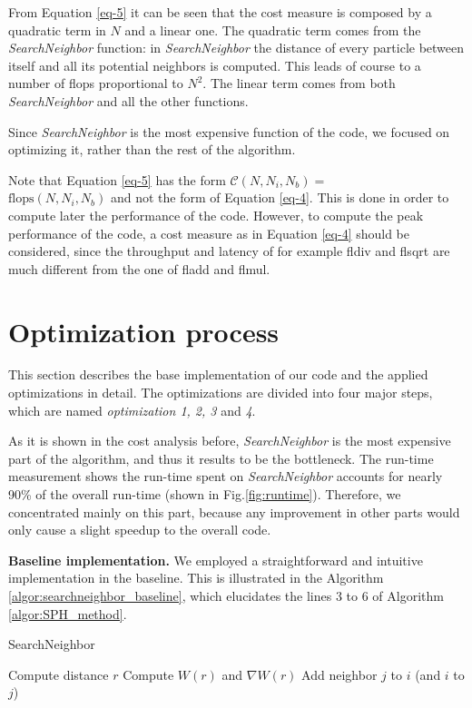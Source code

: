 \documentclass[letterpaper]{article}
\newcommand{\mypar}[1]{{\bf #1.}}
\begin{document}
From Equation \ref{eq-5} it can be seen that the cost measure is composed by a quadratic term in $N$ and a linear one. The quadratic term comes from the \emph{SearchNeighbor} function: in \emph{SearchNeighbor} the distance of every particle between itself and all its potential neighbors is computed. This leads of course to a number of flops proportional to $N^2$. The linear term comes from both \emph{SearchNeighbor} and all the other functions.

Since \emph{SearchNeighbor} is the most expensive function of the code, we focused on optimizing it, rather than the rest of the algorithm.

Note that Equation \ref{eq-5} has the form $\mathcal{C}(N, N_i, N_b)=$\\ $\text{flops}(N, N_i, N_b)$ and not the form of Equation \ref{eq-4}. This is done in order to compute later the performance of the code. However, to compute the peak performance of the code, a cost measure as in Equation \ref{eq-4} should be considered, since the throughput and latency of for example fldiv and flsqrt are much different from the one of fladd and flmul.
\section{Optimization process}\label{sec:optimization}
This section describes the base implementation of our code and the applied optimizations in detail. The optimizations are divided into four major steps, which are named \emph{optimization 1, 2, 3} and \emph{4}.

As it is shown in the cost analysis before, \emph{SearchNeighbor} is the most expensive part of the algorithm, and thus it results to be the bottleneck. The run-time measurement shows the run-time spent on \emph{SearchNeighbor} accounts for nearly 90\% of the overall run-time (shown in Fig.\ref{fig:runtime}). Therefore, we concentrated mainly on this part, because any improvement in other parts would only cause a slight speedup to the overall code.

\mypar{Baseline implementation}
We employed a straightforward and intuitive implementation in the baseline. This is illustrated in the Algorithm \ref{algor:searchneighbor_baseline}, which elucidates the lines 3 to 6 of Algorithm \ref{algor:SPH_method}.
\begin{algorithm} 
\begin{algorithmic}[1]
\caption{SearchNeighbor}
\label{algor:searchneighbor_baseline}
            \STATE Compute distance $r$
                \STATE Compute $W(r)$ and $\nabla W(r)$
                \STATE Add neighbor $j$ to $i$ (and $i$ to $j$)
            \ENDIF
        \ENDIF
    \ENDFOR
\ENDFOR
\end{algorithmic}  
\end{algorithm}
\end{document}
